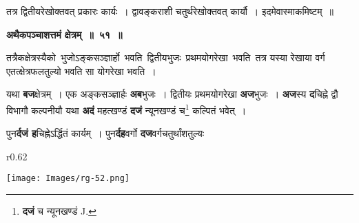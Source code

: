 \documentclass[11pt, openany]{book}
\begin{document}
 तत्र द्वितीयरेखोक्तवत् प्रकारः कार्यः~। द्वावङ्कराशी चतुर्थरेखोक्तवत् कार्यौ~। इदमेवास्माकमिष्टम्~॥ \\
\vspace{2mm}
 
\begin{center}
\textbf{\large अथैकपञ्चाशत्तमं क्षेत्रम्~॥~५१~॥}
\end{center}

तत्रैकक्षेत्रस्यैको \,भुजोऽङ्कसञ्ज्ञार्हो \,भवति \,द्वितीयभुजः \,प्रथमयोगरेखा \,भवति \,तत्र यस्या रेखाया वर्ग एतत्क्षेत्रफलतुल्यो भवति सा योगरेखा भवति~। \\
\vspace{-2mm}

 यथा \textbf{बज}क्षेत्रम्~। एक अङ्कसञ्ज्ञार्हः \textbf{अब}भुजः~। द्वितीयः प्रथमयोगरेखा \textbf{अज}भुजः~। \textbf{अज}स्य \textbf{द}चिह्ने द्वौ विभागौ कल्पनीयौ यथा \textbf{अदं} महत्खण्डं \textbf{दजं} न्यूनखण्डं च\renewcommand{\thefootnote}{१}\footnote{\textbf{दजं} च न्यूनखण्डं J.} कल्पितं भवेत्~। \\
\vspace{-2mm}
 
 पुन\textbf{र्दजं ह}चिह्नेऽर्द्धितं कार्यम्~। पुन\textbf{र्दह}वर्गो \textbf{दज}वर्गचतुर्थांशतुल्यः 

\newpage

\begin{wrapfigure}{r}{0.62\textwidth}
\vspace{-6mm}
\begin{flushright}
\texttt{[image: Images/rg-52.png]}
\end{flushright}
\vspace{-8mm}
\end{wrapfigure}
\end{document}
